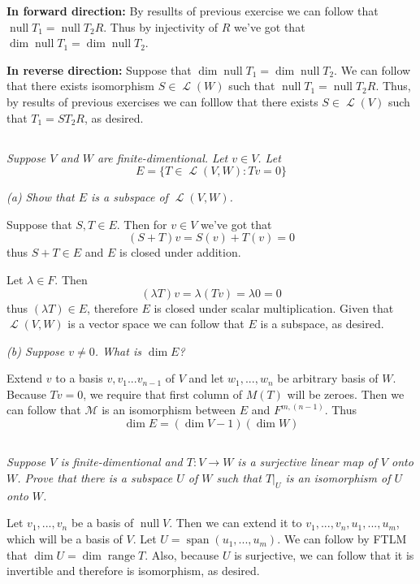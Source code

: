 \documentclass[11pt,oneside,titlepage]{book}
\DeclareMathOperator \map {\mathcal {L}}
\DeclareMathOperator \ns {null}
\DeclareMathOperator \range {range}
\DeclareMathOperator \Span {span}
\begin{document}
\textbf{In forward direction: }
By resullts of previous exercise we can follow that $\ns T_1 = \ns T_2 R$.
Thus by injectivity of $R$ we've got that $\dim \ns T_1 = \dim \ns T_2$.

\textbf{In reverse direction: }
Suppose that $\dim \ns T_1 = \dim \ns T_2$. We can follow that there exists isomorphism
$S \in \map (W)$ such that $\ns T_1 = \ns T_2 R$. Thus, by results of previous exercises we
can folllow that there exists $S \in \map (V)$ such that $T_1 = S T_2 R$, as desired.

\subsection{}

\textit{Suppose $V$ and $W$ are finite-dimentional. Let $v \in V$. Let }
$$E = \{T \in \map(V, W): Tv = 0 \}$$

\textit{(a) Show that $E$ is a subspace of $\map (V, W)$.}

Suppose that $S, T \in E$. Then for $v \in V$ we've got that 
$$(S + T)v = S(v) + T(v) = 0$$
thus $S + T \in E$ and $E$ is closed under addition.

Let $\lambda \in F$.  Then
$$(\lambda T)v = \lambda (T v) = \lambda 0 = 0$$
thus $(\lambda T) \in E$, therefore $E$ is closed under scalar multiplication. Given that
$\map (V, W)$ is a vector space we can follow that $E$ is a subspace, as desired.

\textit{(b) Suppose $v \neq 0$. What is $\dim E$?}

Extend $v$ to a basis $v, v_1 ... v_{n - 1}$  of $V$ and let $w_1, ..., w_n$ be
arbitrary basis of $W$. Because $Tv = 0$, we require that first column  of $M(T)$ will be
zeroes. Then we can follow that $\mathcal M$ is an
isomorphism between $E$ and $F^{m, (n - 1)}$. Thus
$$\dim E = (\dim V - 1)(\dim W)$$

\subsection{}

\textit{Suppose $V$ is finite-dimentional and $T: V \to W$ is a surjective linear map
  of $V$ onto $W$. Prove that there is a subspace $U$ of $W$ such that
  $T|_U$ is an isomorphism of $U$ onto $W$. }

Let $v_1, ..., v_n$ be a basis of $\ns V$. Then we can extend it to  $v_1, ..., v_n, u_1, ..., u_m$,
which will be a basis of $V$. Let $U = \Span(u_1, ..., u_m)$. We can follow by FTLM that
$\dim U = \dim \range T$. Also, because $U$ is surjective, we can follow that it is invertible
and therefore is isomorphism, as desired.
\end{document}
